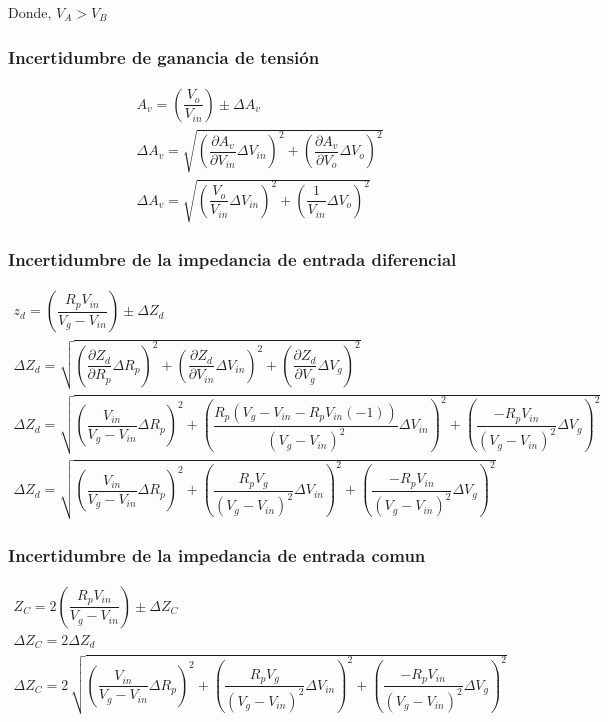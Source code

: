 Donde, $V_A > V_B$

\subsubsection{Incertidumbre de ganancia de tensión}
\begin{gather}
    A_v = \left(\dfrac{V_o}{V_{in}}\right) \pm \Delta A_v  \nonumber \\[0.2cm]
    \Delta A_v = \sqrt{\left(\dfrac{\partial A_v }{\partial V_{in}}\Delta V_{in}\right)^2+\left(\dfrac{\partial A_v }{\partial V_o}\Delta V_o\right)^2} \nonumber \\[0.2cm]
    \Delta A_v = \sqrt{\left(\dfrac{V_o}{V_{in}}\Delta V_{in}\right)^2 + \left(\dfrac{1}{V_{in}}\Delta V_o\right)^2}
    \label{eqn:incertidumbre_av}
\end{gather}

\subsubsection{Incertidumbre de la impedancia de entrada diferencial}

\begin{gather}
    z_d=\left(\dfrac{R_pV_{in}}{V_g-V_{in}}\right)\pm \Delta Z_d  \nonumber \\[0.2cm]
    \Delta Z_d = \sqrt{\left(\dfrac{\partial Z_d}{\partial R_p}\Delta R_p\right)^2 +\left(\dfrac{\partial Z_d}{\partial V_{in}}\Delta V_{in}\right)^2+\left(\dfrac{\partial Z_d}{\partial V_g}\Delta V_g\right)^2} \nonumber \\[0.2cm]
    \Delta Z_d = \sqrt{\left(\dfrac{V_{in}}{V_g-V_{in}}\Delta R_p\right)^2 +\left(\dfrac{R_p(V_g-V_{in}-R_pV_{in}(-1))}{(V_g-V_{in})^2}\Delta V_{in}\right)^2+\left(\dfrac{-R_pV_{in}}{(V_g-V_{in})^2}\Delta V_g\right)^2} \nonumber \\[0.2cm]
    \Delta Z_d = \sqrt{\left(\dfrac{V_{in}}{V_g-V_{in}}\Delta R_p\right)^2 +\left(\dfrac{R_pV_g}{(V_g-V_{in})^2}\Delta V_{in}\right)^2+\left(\dfrac{-R_pV_{in}}{(V_g-V_{in})^2}\Delta V_g\right)^2}
\end{gather}

\subsubsection{Incertidumbre de la impedancia de entrada comun}

\begin{gather}
    Z_C=2\left(\dfrac{R_pV_{in}}{V_g-V_{in}}\right)\pm \Delta Z_C
    \nonumber \\[0.2cm]
    \Delta Z_C = 2 \Delta Z_d \nonumber \\[0.2cm]
    \Delta Z_C = 2\,\sqrt{\left(\dfrac{V_{in}}{V_g-V_{in}}\Delta R_p\right)^2 +\left(\dfrac{R_pV_g}{(V_g-V_{in})^2}\Delta V_{in}\right)^2+\left(\dfrac{-R_pV_{in}}{(V_g-V_{in})^2}\Delta V_g\right)^2}
\end{gather}

